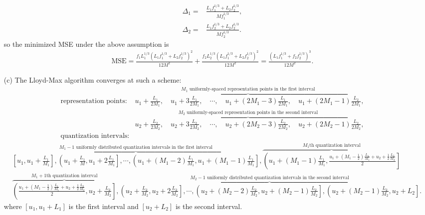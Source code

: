 \documentclass{assignment}
\begin{document}
\begin{sol}
\begin{itemize}
\begin{align}
            \Delta_1=&\frac{L_1f_1^{1/3}+L_2f_2^{1/3}}{Mf_1^{1/3}},\\
            \Delta_2=&\frac{L_1f_2^{1/3}+L_2f_2^{1/3}}{Mf_2^{1/3}}.
        \end{align}
        so the minimized MSE under the above assumption is
        \begin{align}
            \text{MSE}=\frac{f_1L_1^{1/3}(L_1f_1^{1/3}+L_2f_2^{1/3})^2}{12M^2}+\frac{f_2L_2^{1/3}(L_1f_1^{1/3}+L_2f_2^{1/3})^2}{12M^2}=\frac{(L_1f_1^{1/3}+f_2f_2^{1/3})^3}{12M^2}.
        \end{align}
        \item[(c)] The Lloyd-Max algorithm converges at such a scheme:
        \begin{align*}
            \text{representation points}:&\overbrace{u_1+\frac{L_1}{2M_1},\quad u_1+3\frac{L_1}{2M_1},\quad\cdots,\quad u_1+(2M_1-3)\frac{L_1}{2M_1},\quad u_1+(2M_1-1)\frac{L_2}{2M_1}}^{M_1 \text{ uniformly-spaced representation points in the first interval}},\\
            &\overbrace{u_2+\frac{L_2}{2M_2},\quad u_2+3\frac{L_2}{2M_2},\quad\cdots,\quad u_2+(2M_2-3)\frac{L_2}{2M_2},\quad u_2+(2M_2-1)\frac{L_2}{2M_2}}^{M_2 \text{ uniformly-spaced representation points in the second interval}},\\
            \text{quantization intervals}:&
        \end{align*}
        {\scriptsize
        \begin{align*}
            &\overbrace{\left[u_1,u_1+\frac{L_1}{M_1}\right],\left(u_1+\frac{L_1}{M},u_1+2\frac{L_1}{M_1}\right],\cdots,\left(u_1+(M_1-2)\frac{L_1}{M_1},u_1+(M_1-1)\frac{L_1}{M_1}\right]}^{M_1-1\text{ uniformly distributed quantization intervals in the first interval}},\overbrace{\left(u_1+(M_1-1)\frac{L_1}{M_1},\frac{u_1+(M_1-\frac{1}{2})\frac{L_1}{M_1}+u_2+\frac{1}{2}\frac{L_2}{M_2}}{2}\right]}^{M_1\text{th quantization interval}}\\
            &\overbrace{\left(\frac{u_1+(M_1-\frac{1}{2})\frac{L_1}{M_1}+u_2+\frac{1}{2}\frac{L_2}{M_2}}{2},u_2+\frac{L_2}{M_2}\right]}^{M_1+1\text{th quantization interval}},\overbrace{\left(u_2+\frac{L_2}{M_2},u_2+2\frac{L_2}{M_2}\right],\cdots,\left(u_2+(M_2-2)\frac{L_2}{M_2},u_2+(M_2-1)\frac{L_2}{M_2}\right],\left(u_2+(M_2-1)\frac{L_2}{M_2},u_2+L_2\right]}^{M_2-1\text{ uniformly distributed quantization intervals in the second interval}}.
        \end{align*}
        }%
        where $[u_1,u_1+L_1]$ is the first interval and $[u_2+L_2]$ is the second interval.\\

\end{itemize}
\end{sol}
\end{document}
